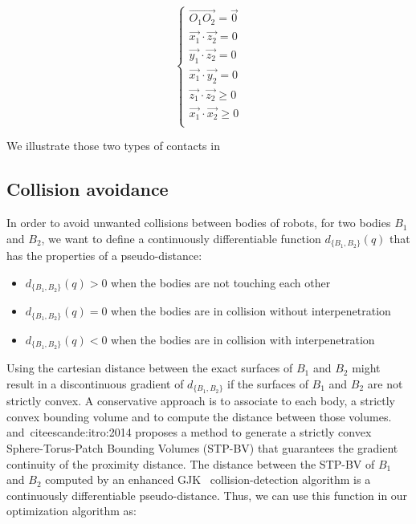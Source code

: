 \begin{equation}
\label{eq:fixed_contact}
\boxed{\left\{
  \begin{array}{l}
    \overrightarrow{O_1O_2} = \vec{0}\\
    \vec{x_1}\cdot\vec{z_2} = 0\\
    \vec{y_1}\cdot\vec{z_2} = 0\\
    \vec{x_1}\cdot\vec{y_2} = 0\\
    \vec{z_1}\cdot\vec{z_2} \geq 0\\
    \vec{x_1}\cdot\vec{x_2} \geq 0\\
  \end{array}
  \right.}
\end{equation}

We illustrate those two types of contacts in~


\subsection{Collision avoidance}
\label{sub:collision_avoidance}


In order to avoid unwanted collisions between bodies of robots, for two bodies $B_1$ and $B_2$, we want to define a continuously differentiable function $d_{\{B_1, B_2\}}(q)$ that has the properties of a pseudo-distance:
\begin{itemize}
  \item $d_{\{B_1, B_2\}}(q) > 0$ when the bodies are not touching each other
  \item $d_{\{B_1, B_2\}}(q) = 0$ when the bodies are in collision without interpenetration
  \item $d_{\{B_1, B_2\}}(q) < 0$ when the bodies are in collision with interpenetration
\end{itemize}

Using the cartesian distance between the exact surfaces of $B_1$ and $B_2$ might result in a discontinuous gradient of $d_{\{B_1, B_2\}}$ if the surfaces of $B_1$ and $B_2$ are not strictly convex.
A conservative approach is to associate to each body, a strictly convex bounding volume and to compute the distance between those volumes.
\cite{escande:humanoids:2007} and~cite{escande:itro:2014} proposes a method to generate a strictly convex Sphere-Torus-Patch Bounding Volumes (STP-BV) that guarantees the gradient continuity of the proximity distance.
The distance between the STP-BV of $B_1$ and $B_2$ computed by an enhanced GJK~\cite{gilbert-1988a} collision-detection algorithm is a continuously differentiable pseudo-distance.
Thus, we can use this function in our optimization algorithm as:

